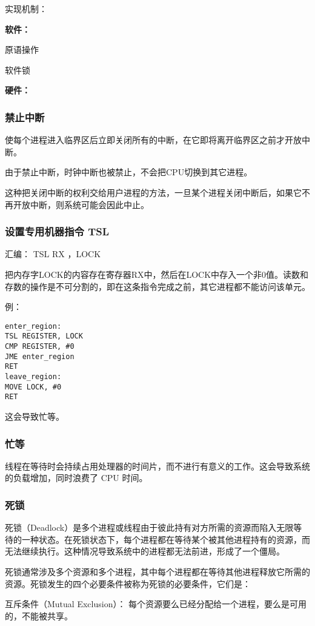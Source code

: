 \documentclass{ctexart}
\begin{document}
实现机制：

\textbf{软件：}

原语操作

软件锁

\textbf{硬件：}

\subsubsection{禁止中断}

使每个进程进入临界区后立即关闭所有的中断，在它即将离开临界区之前才开放中断。

由于禁止中断，时钟中断也被禁止，不会把CPU切换到其它进程。

这种把关闭中断的权利交给用户进程的方法，一旦某个进程关闭中断后，如果它不再开放中断，则系统可能会因此中止。

\subsubsection{设置专用机器指令 TSL}
汇编： TSL RX ，LOCK

把内存字LOCK的内容存在寄存器RX中，然后在LOCK中存入一个非0值。读数和存数的操作是不可分割的，即在这条指令完成之前，其它进程都不能访问该单元。

例：
\begin{lstlisting}
enter_region:
TSL REGISTER, LOCK
CMP REGISTER, #0
JME enter_region
RET 
leave_region:
MOVE LOCK, #0
RET
\end{lstlisting}


这会导致忙等。

\subsubsection{忙等}
线程在等待时会持续占用处理器的时间片，而不进行有意义的工作。这会导致系统的负载增加，同时浪费了 CPU 时间。

\subsubsection{死锁}
死锁（Deadlock）是多个进程或线程由于彼此持有对方所需的资源而陷入无限等待的一种状态。在死锁状态下，每个进程都在等待某个被其他进程持有的资源，而无法继续执行。这种情况导致系统中的进程都无法前进，形成了一个僵局。

死锁通常涉及多个资源和多个进程，其中每个进程都在等待其他进程释放它所需的资源。死锁发生的四个必要条件被称为死锁的必要条件，它们是：

互斥条件（Mutual Exclusion）： 每个资源要么已经分配给一个进程，要么是可用的，不能被共享。
\end{document}
